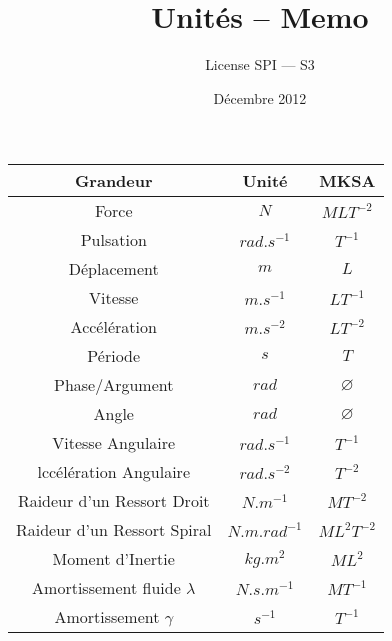 \documentclass[a4paper, 11pt]{article}
\title{Unités -- Memo}
\author{License SPI — S3}
\date{Décembre 2012}
\begin{document}
\maketitle

\begin{center}
\begin{tabular}{c|c|c}
    Grandeur & Unité & MKSA\\\hline\hline
    Force & $N$ & $MLT^{-2}$\\
    Pulsation & $rad.s^{-1}$ & $T^{-1}$\\
    Déplacement & $m$ & $L$\\
    Vitesse & $m.s^{-1}$ & $LT^{-1}$\\
    Accélération & $m.s^{-2}$ & $LT^{-2}$\\
    Période & $s$ & $T$\\
    Phase/Argument & $rad$ & $\varnothing$\\
    Angle & $rad$ & $\varnothing$\\
    Vitesse Angulaire & $rad.s^{-1}$ & $T^{-1}$\\
    lccélération Angulaire & $rad.s^{-2}$ & $T^{-2}$\\
    Raideur d'un Ressort Droit & $N.m^{-1}$ & $MT^{-2}$\\
    Raideur d'un Ressort Spiral & $N.m.rad^{-1}$ & $ML^2T^{-2}$\\
    Moment d'Inertie & $kg.m^2$ & $ML^2$\\
    Amortissement fluide $\lambda$ & $N.s.m^{-1}$ & $MT^{-1}$\\
    Amortissement $\gamma$ & $s^{-1}$ & $T^{-1}$\\
\end{tabular}
\end{center}
\end{document}
